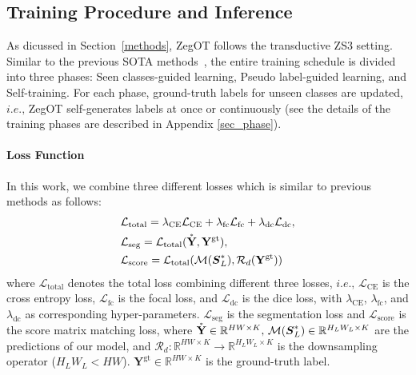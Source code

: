 \documentclass[nohyperref]{article}
\newcommand{\bs}{\boldsymbol}
\newcommand{\asty}{\accentset{\ast}{\mathbf{Y}}}
\newcommand{\gty}{\mbf{Y}^{\text{gt}}}
\newcommand{\mbf}{\mathbf}
\theoremstyle{plain}
\theoremstyle{definition}
\theoremstyle{remark}
\begin{document}
\subsection{Training Procedure and Inference}
As dicussed in Section~\ref{methods}, ZegOT follows the transductive ZS3 setting. Similar to the previous SOTA methods~\cite{zhou2022zegclip, zhou2022maskclip}, the entire training schedule is divided into three phases:
Seen classes-guided learning, Pseudo label-guided learning, and Self-training. 
For each phase, ground-truth labels for unseen classes are updated, $\textit{i.e.,}$ ZegOT self-generates labels at once or continuously (see the details of the training phases are described in Appendix \ref{sec_phase}).

\paragraph{Loss Function} \label{sec:loss}
In this work, we combine three different losses which is similar to previous methods as follows:
\begin{align}
&\mathcal{L}_{\text{total}} = \lambda_{\text{CE}} \mathcal{L}_{\text{CE}} + \lambda_{\text{fc}} \mathcal{L}_{\text{fc}} + \lambda_{\text{dc}} \mathcal{L}_{\text{dc}}, 	\\
&\mathcal{L}_{\text{seg}} = \mathcal{L}_{\text{total}}(\asty, \gty), \\
&\mathcal{L}_{\text{score}} = \mathcal{L}_{\text{total}}(\mathcal{M}(\bs{S}^{\ast}_L),\mathcal{R}_{d}(\gty))
\label{losses}
\end{align}
where $\mathcal{L}_{\text{total}}$ denotes the total loss combining different three losses, $\textit{i.e.,}$ $\mathcal{L}_{\text{CE}}$ is the cross entropy loss, $\mathcal{L}_{\text{fc}}$ is the focal loss, and $\mathcal{L}_{\text{dc}}$ is the dice loss, with $\lambda_{\text{CE}}$, $\lambda_{\text{fc}}$, and  $\lambda_{\text{dc}}$ as corresponding hyper-parameters. 
$\mathcal{L}_{\text{seg}}$ is the segmentation loss and $\mathcal{L}_{\text{score}}$ is the score matrix matching loss, where $\asty \in \mathbb{R}^{HW \times K}, \, \mathcal{M}(\bs{S}^*_{L}) \in \mathbb{R}^{H_LW_L\times K}$ are the predictions of our model, and $\mathcal{R}_d:\mathbb{R}^{HW \times K} \rightarrow \mathbb{R}^{H_LW_L \times K}$ is the downsampling operator ($H_LW_L < HW$). $\gty \in \mathbb{R}^{HW \times K}$ is the ground-truth label.
\end{document}
